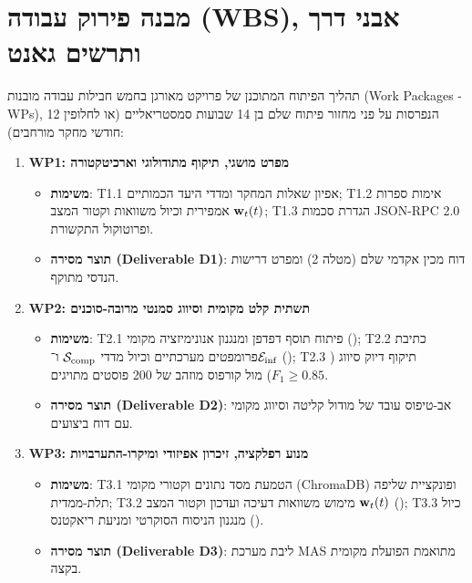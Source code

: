 \section{מבנה פירוק עבודה (WBS), אבני דרך ותרשים גאנט}
\label{sec:impl_milestones_gantt}
תהליך הפיתוח המתוכנן של פרויקט \projectname{} מאורגן בחמש חבילות עבודה מובנות (\textenglish{Work Packages - WPs}), הנפרסות על פני מחזור פיתוח שלם בן 14 שבועות סמסטריאליים (או לחלופין 12 חודשי מחקר מורחבים):

\begin{enumerate}
    \item \textbf{\textenglish{WP1}: מפרט מושגי, תיקוף מתודולוגי וארכיטקטורה}
    \begin{itemize}
        \item \textbf{משימות}: \textenglish{T1.1} אפיון שאלות המחקר ומדדי היעד הכמותיים; \textenglish{T1.2} אימות ספרות אמפירית וכיול משוואות וקטור המצב $\mathbf{w}_t(t)$; \textenglish{T1.3} הגדרת סכמות \textenglish{JSON-RPC 2.0} ופרוטוקול התקשורת.
        \item \textbf{תוצר מסירה (\textenglish{Deliverable D1})}: דוח מכין אקדמי שלם (מטלה 2) ומפרט דרישות הנדסי מתוקף.
    \end{itemize}

    \item \textbf{\textenglish{WP2}: תשתית קלט מקומית וסיווג סמנטי מרובה-סוכנים}
    \begin{itemize}
        \item \textbf{משימות}: \textenglish{T2.1} פיתוח תוסף דפדפן ומנגנון אנונימיזציה מקומי (\agentObserver{}); \textenglish{T2.2} כתיבת פרומפטים מערכתיים וכיול מדדי $\mathcal{S}_{\text{comp}}$ ו־$\mathcal{E}_{\text{inf}}$ (\agentAnalyst{}); \textenglish{T2.3} תיקוף דיוק סיווג ($F_1 \ge 0.85$) מול קורפוס מוזהב של 200 פוסטים מתויגים.
        \item \textbf{תוצר מסירה (\textenglish{Deliverable D2})}: אב-טיפוס עובד של מודול קליטה וסיווג מקומי עם דוח ביצועים.
    \end{itemize}

    \item \textbf{\textenglish{WP3}: מנוע רפלקציה, זיכרון אפיזודי ומיקרו-התערבויות}
    \begin{itemize}
        \item \textbf{משימות}: \textenglish{T3.1} הטמעת מסד נתונים וקטורי מקומי (\textenglish{ChromaDB}) ופונקציית שליפה תלת-ממדית; \textenglish{T3.2} מימוש משוואות דעיכה ועדכון וקטור המצב $\mathbf{w}_t(t)$ (\agentReflector{}); \textenglish{T3.3} כיול מנגנון הניסוח הסוקרטי ומניעת ריאקטנס (\agentInterventionist{}).
        \item \textbf{תוצר מסירה (\textenglish{Deliverable D3})}: ליבת מערכת \textenglish{MAS} מתואמת הפועלת מקומית בקצה.
    \end{itemize}


\end{enumerate}
